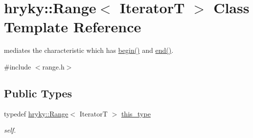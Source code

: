 \hypertarget{classhryky_1_1_range}{\section{hryky\-:\-:Range$<$ Iterator\-T $>$ Class Template Reference}
\label{classhryky_1_1_range}
}


mediates the characteristic which has \hyperlink{classhryky_1_1_range_aaa45d0481e79fb4d22ec8f048fa23086}{begin()} and \hyperlink{classhryky_1_1_range_a202ec210efd7e9cb9a22b2e98ab21107}{end()}.  




{\ttfamily \#include $<$range.\-h$>$}

\subsection*{Public Types}
\begin{DoxyCompactItemize}
\item 
\hypertarget{classhryky_1_1_range_a19d3a6ea685d44106936a6304fe44ec1}{typedef \hyperlink{classhryky_1_1_range}{hryky\-::\-Range}$<$ Iterator\-T $>$ \hyperlink{classhryky_1_1_range_a19d3a6ea685d44106936a6304fe44ec1}{this\-\_\-type}}\label{classhryky_1_1_range_a19d3a6ea685d44106936a6304fe44ec1}

\begin{DoxyCompactList}\small\item\em self. \end{DoxyCompactList}\end{DoxyCompactItemize}
